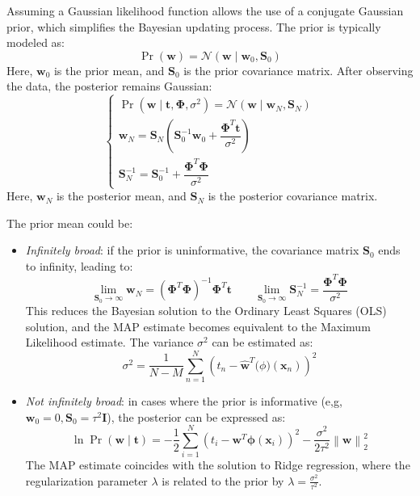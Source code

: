 Assuming a Gaussian likelihood function allows the use of a conjugate Gaussian prior, which simplifies the Bayesian updating process. The prior is typically modeled as:
\[\Pr(\mathbf{w})=\mathcal{N}(\mathbf{w}\mid\mathbf{w}_0,\mathbf{S}_0)\]
Here, $\mathbf{w}_0$ is the prior mean, and $\mathbf{S}_0$ is the prior covariance matrix.
After observing the data, the posterior remains Gaussian:
\[\begin{cases}
    \Pr(\mathbf{w}\mid\mathbf{t},\boldsymbol{\Phi},\sigma^2)=\mathcal{N}(\mathbf{w}\mid\mathbf{w}_N,\mathbf{S}_N) \\
    \mathbf{w}_N=\mathbf{S}_N\left(\mathbf{S}_0^{-1}\mathbf{w}_0+\dfrac{\boldsymbol{\Phi}^T\mathbf{t}}{\sigma^2}\right) \\
    \mathbf{S}_N^{-1}=\mathbf{S}_0^{-1}+\dfrac{\boldsymbol{\Phi}^T\boldsymbol{\Phi}}{\sigma^2}
\end{cases}\]
Here, $\mathbf{w}_N$ is the posterior mean, and $\mathbf{S}_N$ is the posterior covariance matrix.

The prior mean could be: 
\begin{itemize}
    \item \textit{Infinitely broad}: if the prior is uninformative, the covariance matrix $\mathbf{S}_0$ ends to infinity, leading to:
        \[\lim_{\mathbf{S}_0\rightarrow\infty}\mathbf{w}_N={\left( \boldsymbol{\Phi}^T\boldsymbol{\Phi} \right)}^{-1}\boldsymbol{\Phi}^T\mathbf{t} \qquad \lim_{\mathbf{S}_0\rightarrow\infty}\mathbf{S}_N^{-1}=\dfrac{\boldsymbol{\Phi}^T\boldsymbol{\Phi}}{\sigma^2}\]
        This reduces the Bayesian solution to the Ordinary Least Squares (OLS) solution, and the MAP estimate becomes equivalent to the Maximum Likelihood estimate. 
        The variance $\sigma^2$ can be estimated as:
        \[\sigma^2=\dfrac{1}{N-M}\sum_{n=1}^{N}{\left( t_n-\hat{\mathbf{w}}^T\boldsymbol(\phi)(\mathbf{x}_n) \right)}^2\]
    \item \textit{Not infinitely broad}: in cases where the prior is informative (e,g,$\mathbf{w}_0=0,\mathbf{S}_0=\tau^2\mathbf{I}$), the posterior can be expressed as:
        \[\ln\Pr(\mathbf{w}\mid\mathbf{t})=-\dfrac{1}{2}\sum_{i=1}^{N}{\left(t_i-\mathbf{w}^T\boldsymbol{\phi}(\mathbf{x}_i)\right)}^2-\dfrac{\sigma^2}{2\tau^2}{\left\lVert \mathbf{w}\right\rVert}_2^2 \]
        The MAP estimate coincides with the solution to Ridge regression, where the regularization parameter $\lambda$ is related to the prior by $\lambda=\frac{\sigma^2}{\tau^2}$.
\end{itemize}

